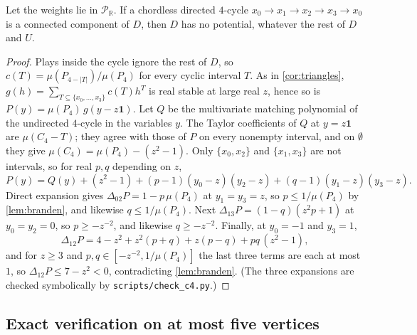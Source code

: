 \documentclass[final]{siamart0516}
\numberwithin{theorem}{section}
\numberwithin{equation}{section}
\theoremstyle{siamnonum}
\theoremstyle{plain}
\newcommand{\code}[1]{{\ttfamily\nolinkurl{#1}}}
\newcommand{\RR}{\mathbb{R}}
\newcommand{\Puis}{\mathcal{P}_{\RR}}
\newcommand{\one}{\mathbf{1}}
\begin{document}
\begin{corollary}\label{cor:c4}
Let the weights lie in $\Puis$. If a chordless directed $4$-cycle $x_0\to x_1\to x_2\to x_3\to x_0$ is a connected component of $D$, then $D$ has no potential, whatever the rest of $D$ and $U$.
\end{corollary}
\begin{proof}
Plays inside the cycle ignore the rest of $D$, so $c(T)=\mu(P_{4-|T|})/\mu(P_4)$ for every cyclic interval $T$. As in \cref{cor:triangles}, $g(h)=\sum_{T\subseteq\{x_0,\dots,x_3\}}c(T)h^T$ is real stable at large real $z$, hence so is $P(y)=\mu(P_4)\,g(y-z\one)$. Let $Q$ be the multivariate matching polynomial of the undirected $4$-cycle in the variables $y$. The Taylor coefficients of $Q$ at $y=z\one$ are $\mu(C_4-T)$; they agree with those of $P$ on every nonempty interval, and on $\emptyset$ they give $\mu(C_4)=\mu(P_4)-(z^2-1)$. Only $\{x_0,x_2\}$ and $\{x_1,x_3\}$ are not intervals, so for real $p,q$ depending on $z$,
\[
P(y)=Q(y)+(z^{2}-1)+(p-1)(y_0-z)(y_2-z)+(q-1)(y_1-z)(y_3-z).
\]
Direct expansion gives $\Delta_{02}P=1-p\,\mu(P_4)$ at $y_1=y_3=z$, so $p\le1/\mu(P_4)$ by \cref{lem:branden}, and likewise $q\le1/\mu(P_4)$. Next $\Delta_{13}P=(1-q)(z^{2}p+1)$ at $y_0=y_2=0$, so $p\ge-z^{-2}$, and likewise $q\ge-z^{-2}$. Finally, at $y_0=-1$ and $y_3=1$,
\[
\Delta_{12}P=4-z^{2}+z^{2}(p+q)+z(p-q)+pq\,(z^{2}-1),
\]
and for $z\ge3$ and $p,q\in[-z^{-2},1/\mu(P_4)]$ the last three terms are each at most $1$, so $\Delta_{12}P\le7-z^{2}<0$, contradicting \cref{lem:branden}. (The three expansions are checked symbolically by \code{scripts/check_c4.py}.)
\end{proof}

\subsection{Exact verification on at most five vertices}
\end{document}

